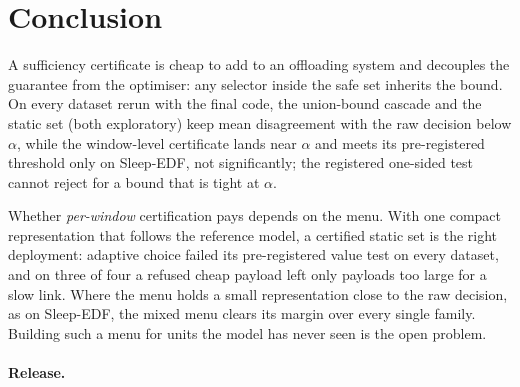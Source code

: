 \section{Conclusion}
\label{sec:conclusion}

A sufficiency certificate is cheap to add to an offloading system and decouples the guarantee from
the optimiser: any selector inside the safe set inherits the bound. On every dataset rerun with the
final code, the union-bound cascade and the static set (both exploratory) keep mean disagreement
with the raw decision below $\alpha$, while the window-level certificate lands near $\alpha$ and
meets its pre-registered threshold only on Sleep-EDF, not significantly; the registered one-sided
test cannot reject for a bound that is tight at $\alpha$.

Whether \emph{per-window} certification pays depends on the menu. With one compact representation
that follows the reference model, a certified static set is the right deployment: adaptive choice
failed its pre-registered value test on every dataset, and on three of four a refused cheap payload
left only payloads too large for a slow link. Where the menu holds a small representation close to
the raw decision, as on Sleep-EDF, the mixed menu clears its margin over every single family. Building such a menu for units the model has
never seen is the open problem.

\paragraph{Release.} 

